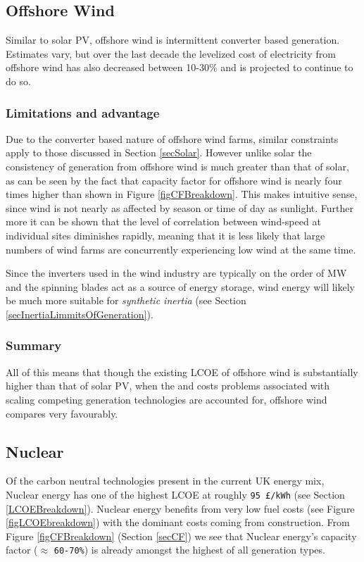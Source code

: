 \documentclass[11pt]{article}
\numberwithin{equation}{section}
\begin{document}
\subsection{Offshore Wind \label{secOffshoreWind}}
\label{sec:orgf6975b5}
Similar to solar PV, offshore wind is intermittent converter based generation. Estimates vary, but over the last decade the levelized cost of electricity from offshore wind has also decreased between 10-30\% and is projected to continue to do so.

\subsubsection{Limitations and advantage}
\label{sec:org901241b}
Due to the converter based nature of offshore wind farms, similar constraints apply to those discussed in Section \ref{secSolar}. However unlike solar the consistency of generation from offshore wind is much greater than that of solar, as can be seen by the fact that capacity factor for offshore wind is nearly four times higher than shown in Figure \ref{figCFBreakdown}. This makes intuitive sense, since wind is not nearly as affected by season or time of day as sunlight. Further more it can be shown that the level of correlation between wind-speed at individual sites diminishes rapidly, meaning that it is less likely that large numbers of wind farms are concurrently experiencing low wind at the same time.

Since the inverters used in the wind industry are typically on the order of MW and the spinning blades act as a source of energy storage, wind energy will likely be much more suitable for \emph{synthetic inertia} (see Section \ref{secInertiaLimmitsOfGeneration}).

\subsubsection{Summary}
\label{sec:org24afc3b}
All of this means that though the existing LCOE of offshore wind is substantially higher than that of solar PV, when the and costs problems associated with scaling competing generation technologies are accounted for, offshore wind compares very favourably.

\subsection{Nuclear}
\label{sec:org8430523}
Of the carbon neutral technologies present in the current UK energy mix, Nuclear energy has one of the highest LCOE at roughly \texttt{95 £/kWh} (see Section \ref{LCOEBreakdown}). Nuclear energy benefits from very low fuel costs (see Figure \ref{figLCOEbreakdown}) with the dominant costs coming from construction. From Figure \ref{figCFBreakdown} (Section \ref{secCF}) we see that Nuclear energy's capacity factor (\(\approx\) \texttt{60-70\%}) is already amongst the highest of all generation types.
\end{document}
